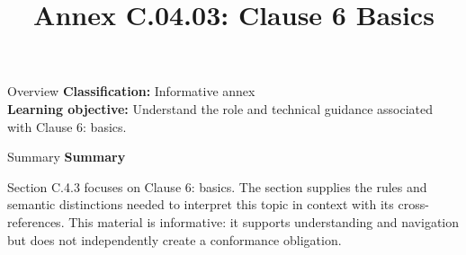\documentclass[10pt,letterpaper]{article}
\title{Annex C.04.03: Clause 6 Basics}
\author{}
\date{}
\begin{document}
\maketitle
\begin{CornellOverviewBox}{Overview}
\textbf{Classification:} Informative annex\\[2pt]
\textbf{Learning objective:} Understand the role and technical guidance associated with Clause 6: basics.
\end{CornellOverviewBox}\begin{CornellSummaryBox}{Summary}
{\sffamily\bfseries\color{Accent} Summary}\par\vspace{3pt}Section C.4.3 focuses on Clause 6: basics. The section supplies the rules and semantic distinctions needed to interpret this topic in context with its cross-references. This material is informative: it supports understanding and navigation but does not independently create a conformance obligation.
\end{CornellSummaryBox}
\end{document}
